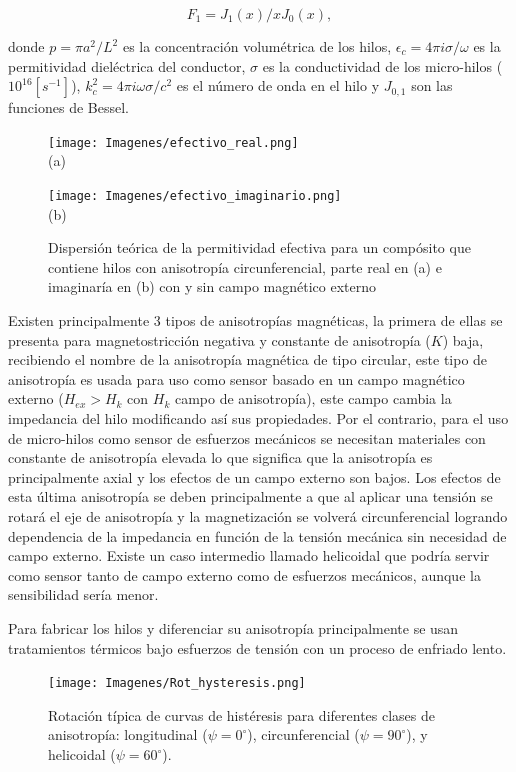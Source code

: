 \documentclass[12pt,letterpaper]{article}
\numberwithin{equation}{section}
\begin{document}
$$F_1=J_1(x)/xJ_0(x),$$

donde $p = \pi a^2/L^2$ es la concentración volumétrica de los hilos, $\epsilon_c = 4\pi i \sigma/\omega$ es la permitividad dieléctrica del conductor, $\sigma$ es la conductividad de los micro-hilos (~$10^{16} [s^{-1}]$), $k_c^2 = 4\pi i \omega\sigma / c^2$ es el número de onda en el hilo y $J_{0,1}$ son las funciones de Bessel.

\begin{figure}[H]
	\begin{minipage}{0.5\linewidth}
		\hspace{-20mm}
		\centering\texttt{[image: Imagenes/efectivo\_real.png]}\\
		\centering(a)
	\end{minipage}
	\begin{minipage}{0.5\linewidth}
		\centering\texttt{[image: Imagenes/efectivo\_imaginario.png]}\\
		\centering(b)
	\end{minipage}
	\caption{Dispersión teórica de la permitividad efectiva para un compósito que contiene hilos con anisotropía circunferencial, parte real en (a) e imaginaría en (b) con y sin campo magnético externo}
	\label{fig:efectivo}
\end{figure}

Existen principalmente 3 tipos de anisotropías magnéticas, la primera de ellas se presenta para magnetostricción negativa y constante de anisotropía ($K$) baja, recibiendo el nombre de la anisotropía magnética de tipo circular, este tipo de anisotropía es usada para uso como sensor basado en un campo magnético externo ($H_{ex}>H_k$ con $H_k$ campo de anisotropía), este campo cambia la impedancia del hilo modificando así sus propiedades. Por el contrario, para el uso de micro-hilos como sensor de esfuerzos mecánicos se necesitan materiales con constante de anisotropía elevada lo que significa que la anisotropía es principalmente axial y los efectos de un campo externo son bajos. Los efectos de esta última anisotropía se deben principalmente a que al aplicar una tensión se rotará el eje de anisotropía y la magnetización se volverá circunferencial logrando dependencia de la impedancia en función de la tensión mecánica sin necesidad de campo externo. Existe un caso intermedio llamado helicoidal que podría servir como sensor tanto de campo externo como de esfuerzos mecánicos, aunque la sensibilidad sería menor.

Para fabricar los hilos y diferenciar su anisotropía principalmente se usan tratamientos térmicos bajo esfuerzos de tensión con un proceso de enfriado lento.
\begin{figure}[H]
	\centering\texttt{[image: Imagenes/Rot\_hysteresis.png]}\\
	\caption{Rotación típica de curvas de histéresis para diferentes clases de anisotropía: longitudinal ($\psi=0^\circ$), circunferencial ($\psi=90^\circ$), y helicoidal ($\psi=60^\circ$).}
	\label{fig:Rot_hysteresis}
\end{figure} 
\end{document}
